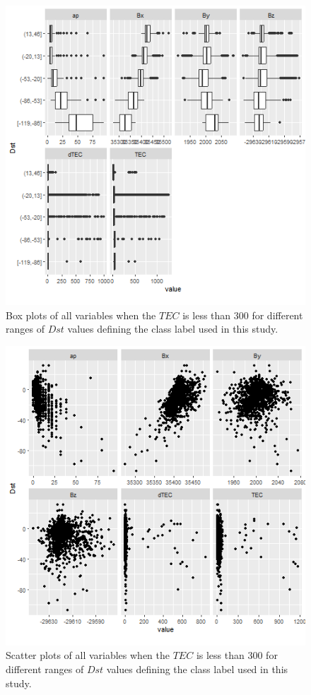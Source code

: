 \documentclass[preprint,12pt]{elsarticle}
\begin{document}
\begin{figure}
    \centering
    \includegraphics[width=0.9\linewidth]{iono3boxplot.png}
    \caption{Box plots of all variables when the $TEC$ is less than $300$ for different ranges of $Dst$ values defining the class label used in this study.}
    \label{fig:iono3boxplot}
\end{figure}

\begin{figure}
    \centering
    \includegraphics[width=0.9\linewidth]{iono3scatterplot.png}
    \caption{Scatter plots of all variables when the $TEC$ is less than $300$ for different ranges of $Dst$ values defining the class label used in this study.}
    \label{fig:iono3scatterplot}
\end{figure}
\end{document}

